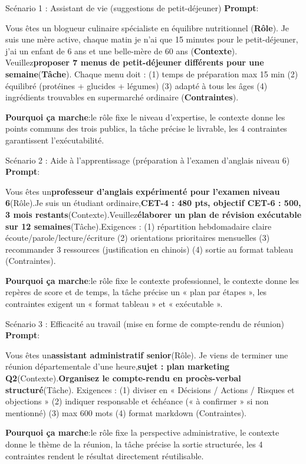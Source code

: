 
\begin{tcbinfo}{Scénario 1 : Assistant de vie (suggestions de petit-déjeuner)}
\textbf{Prompt}:

Vous êtes un blogueur culinaire spécialiste en équilibre nutritionnel (\textbf{Rôle}). Je suis une mère active, chaque matin je n’ai que 15 minutes pour le petit-déjeuner, j’ai un enfant de 6 ans et une belle-mère de 60 ans (\textbf{Contexte}). Veuillez\textbf{proposer 7 menus de petit-déjeuner différents pour une semaine}(\textbf{Tâche}). Chaque menu doit : (1) temps de préparation max 15 min (2) équilibré (protéines + glucides + légumes) (3) adapté à tous les âges (4) ingrédients trouvables en supermarché ordinaire (\textbf{Contraintes}).

\textbf{Pourquoi ça marche}:le rôle fixe le niveau d’expertise, le contexte donne les points communs des trois publics, la tâche précise le livrable, les 4 contraintes garantissent l’exécutabilité.

\end{tcbinfo}

\begin{tcbinfo}{Scénario 2 : Aide à l'apprentissage (préparation à l'examen d'anglais niveau 6)}
\textbf{Prompt}:

Vous êtes un\textbf{professeur d’anglais expérimenté pour l’examen niveau 6}(Rôle).Je suis un étudiant ordinaire,\textbf{CET-4 : 480 pts, objectif CET-6 : 500, 3 mois restants}(Contexte).Veuillez\textbf{élaborer un plan de révision exécutable sur 12 semaines}(Tâche).Exigences : (1) répartition hebdomadaire claire écoute/parole/lecture/écriture (2) orientations prioritaires mensuelles (3) recommander 3 ressources (justification en chinois) (4) sortie au format tableau (Contraintes).

\textbf{Pourquoi ça marche}:le rôle fixe le contexte professionnel, le contexte donne les repères de score et de temps, la tâche précise un « plan par étapes », les contraintes exigent un « format tableau » et « exécutable ».

\end{tcbinfo}

\begin{tcbinfo}{Scénario 3 : Efficacité au travail (mise en forme de compte-rendu de réunion)}
\textbf{Prompt}:

Vous êtes un\textbf{assistant administratif senior}(Rôle). Je viens de terminer une réunion départementale d’une heure,\textbf{sujet : plan marketing Q2}(Contexte).\textbf{Organisez le compte-rendu en procès-verbal structuré}(Tâche). Exigences : (1) diviser en « Décisions / Actions / Risques et objections » (2) indiquer responsable et échéance (« à confirmer » si non mentionné) (3) max 600 mots (4) format markdown (Contraintes).

\textbf{Pourquoi ça marche}:le rôle fixe la perspective administrative, le contexte donne le thème de la réunion, la tâche précise la sortie structurée, les 4 contraintes rendent le résultat directement réutilisable.

\end{tcbinfo}

